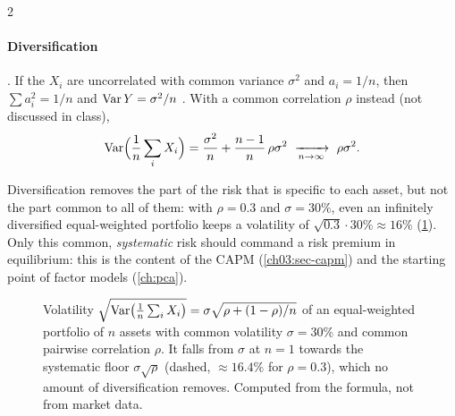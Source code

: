 \begin{paracol}{2}
\paragraph{Diversification} . If the $X_i$ are uncorrelated with common variance
$\sigma^2$ and $a_i=1/n$, then $\sum a_i^2=1/n$ and $\operatorname{Var} Y=\sigma^2/n$ . With a common correlation
$\rho$ instead (not discussed in class),
\[
  \Var\Bigl(\frac1n\sum_iX_i\Bigr)=\frac{\sigma^2}{n}+\frac{n-1}{n}\,\rho\sigma^2\ \xrightarrow[n\to\infty]{}\ \rho\sigma^2 .
\]

\begin{finance}
Diversification removes the part of the risk that is specific to each asset, but not the part common to
all of them: with $\rho=0.3$ and $\sigma=30\%$, even an infinitely diversified equal-weighted portfolio keeps a
volatility of $\sqrt{0.3}\cdot30\%\approx16\%$ (\cref{ch03:fig-divers}). Only this common, \emph{systematic} risk should command a risk
premium in equilibrium: this is the content of the CAPM (\cref{ch03:sec-capm}) and the starting point of
factor models (\cref{ch:pca}).
\end{finance}

\begin{figure}[!htb]
\centering
{}
\caption{Volatility $\sqrt{\operatorname{Var}\bigl(\frac1n\sum_iX_i\bigr)}=\sigma\sqrt{\rho+(1-\rho)/n}$ of an equal-weighted portfolio of $n$ assets with common
volatility $\sigma=30\%$ and common pairwise correlation $\rho$. It falls from $\sigma$ at $n=1$ towards the systematic floor $\sigma\sqrt\rho$
(dashed, $\approx16.4\%$ for $\rho=0.3$), which no amount of diversification removes. Computed from the formula, not from market data.}\label{ch03:fig-divers}
\end{figure}


\end{paracol}
